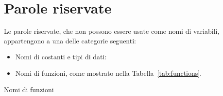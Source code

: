 \chapter{Parole riservate}
\label{reswords}

Le parole riservate, che non possono essere usate come nomi di variabili,
appartengono a una delle categorie seguenti:

\begin{itemize}
\item Nomi di costanti e tipi di dati:
  

\item Nomi di funzioni, come mostrato nella Tabella~\ref{tab:functions}.
\end{itemize}

\begin{table}[htbp]
\caption{Nomi di funzioni}
\label{tab:functions}
\begin{center}

\end{center}
\end{table}


